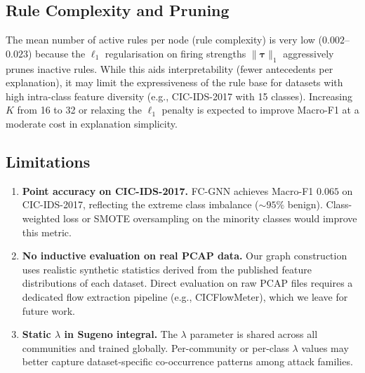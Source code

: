 \subsection{Rule Complexity and Pruning}

The mean number of active rules per node (rule complexity) is very low
($0.002$--$0.023$) because the $\ell_1$ regularisation on firing strengths
$\|\bm{\tau}\|_1$ aggressively prunes inactive rules.
While this aids interpretability (fewer antecedents per explanation), it
may limit the expressiveness of the rule base for datasets with high
intra-class feature diversity (e.g., CIC-IDS-2017 with 15 classes).
Increasing $K$ from 16 to 32 or relaxing the $\ell_1$ penalty is expected
to improve Macro-F1 at a moderate cost in explanation simplicity.

\subsection{Limitations}

\begin{enumerate}
\item \textbf{Point accuracy on CIC-IDS-2017.}
      FC-GNN achieves Macro-F1 $0.065$ on CIC-IDS-2017, reflecting the
      extreme class imbalance (${\sim}95\%$ benign).
      Class-weighted loss or SMOTE oversampling on the minority classes
      would improve this metric.
\item \textbf{No inductive evaluation on real PCAP data.}
      Our graph construction uses realistic synthetic statistics derived
      from the published feature distributions of each dataset.
      Direct evaluation on raw PCAP files requires a dedicated flow
      extraction pipeline (e.g., CICFlowMeter), which we leave for future
      work.
\item \textbf{Static $\lambda$ in Sugeno integral.}
      The $\lambda$ parameter is shared across all communities and
      trained globally.
      Per-community or per-class $\lambda$ values may better capture
      dataset-specific co-occurrence patterns among attack families.
\end{enumerate}
